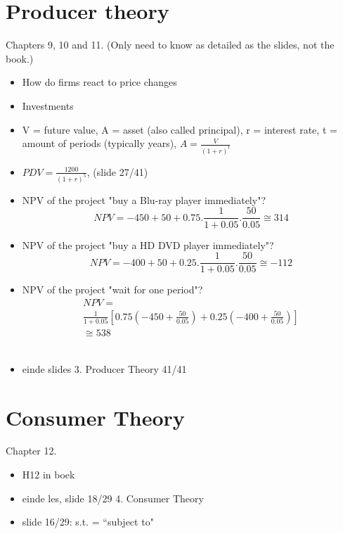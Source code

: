 \documentclass[12pt, a4paper, titlepage]{extarticle}
\begin{document}
	\section{Producer theory}
	Chapters 9, 10 and 11. (Only need to know as detailed as the slides, not the book.)
	\begin{itemize}
		\item How do firms react to price changes
		\item Investments
		\item V = future value, A = asset (also called principal), r = interest rate, t = amount of periods (typically years), $A = \frac{V}{(1+r)^t}$ 
		\item $PDV = \frac{1200}{(1+r)^5}$, (slide 27/41)
		\item NPV of the project "buy a Blu-ray player immediately"? 
		\[ NPV = -450 + 50 + 0.75.\frac{1}{1+0.05}.\frac{50}{0.05} \cong 314 \]
		\item NPV of the project "buy a HD DVD player immediately"? 
		\[ NPV = -400 + 50 + 0.25.\frac{1}{1+0.05}.\frac{50}{0.05} \cong -112 \]
		\item NPV of the project "wait for one period"?
		\begin{equation}
		    \begin{gathered}
		        NPV = \\ \frac{1}{1+0.05}\left[0.75\left(-450 + \frac{50}{0.05}\right) + 0.25\left(-400 + \frac{50}{0.05}\right)\right] \\ \cong 538
		    \end{gathered}
		\end{equation}
		\\
		\item einde slides 3. Producer Theory 41/41
	\end{itemize}
	
	\section{Consumer Theory}
	Chapter 12.
	\begin{itemize}
		\item H12 in boek
		\item einde les, slide 18/29 4. Consumer Theory
		\item slide 16/29: s.t. = ``subject to"
	\end{itemize}
	
\end{document}

